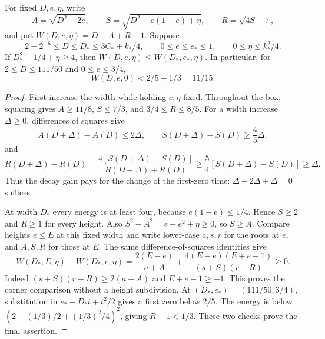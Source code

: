 \begin{lemma}\label{lem:joint-stopping-corner}
For fixed $D,e,\eta$, write
\[
 A=\sqrt{D^2-2e},\qquad
 S=\sqrt{D^2-e(1-e)+\eta},\qquad R=\sqrt{4S-7},
\]
and put $W(D,e,\eta)=D-A+R-1$.
Suppose
\[
 2-2^{-6}\le D\le D_*\le3C_*+ k_*/4,\qquad
 0\le e\le e_*\le1,\qquad0\le\eta\le k_*^2/4.
\]
If $D_*^2-1/4+\eta\ge4$, then
$W(D,e,\eta)\le W(D_*,e_*,\eta)$.
In particular, for $2\le D\le111/50$ and $0\le e\le3/4$,
\[
 W(D,e,0)<2/5+1/3=11/15.
\]
\end{lemma}
\begin{proof}
First increase the width while holding $e,\eta$ fixed. Throughout the box,
squaring gives $A\ge11/8$, $S\le7/3$, and $3/4\le R\le8/5$.
For a width increase $\Delta\ge0$, differences of squares give
\[
 A(D+\Delta)-A(D)\le2\Delta,\qquad
 S(D+\Delta)-S(D)\ge\frac45\Delta,
\]
and
\[
 R(D+\Delta)-R(D)
 =\frac{4[S(D+\Delta)-S(D)]}{R(D+\Delta)+R(D)}
 \ge\frac54[S(D+\Delta)-S(D)]\ge\Delta.
\]
Thus the decay gain pays for the change of the first-zero time:
$\Delta-2\Delta+\Delta=0$ suffices.

At width $D_*$ every energy is at least four, because
$e(1-e)\le1/4$. Hence $S\ge2$ and $R\ge1$ for every height.
Also $S^2-A^2=e+e^2+\eta\ge0$, so $S\ge A$.
Compare heights $e\le E$ at this fixed width and write lower-case
$a,s,r$ for the roots at $e$, and $A,S,R$ for those at $E$.
The same difference-of-squares identities give
\[
 W(D_*,E,\eta)-W(D_*,e,\eta)
 =\frac{2(E-e)}{a+A}
   +\frac{4(E-e)(E+e-1)}{(s+S)(r+R)}\ge0.
\]
Indeed $(s+S)(r+R)\ge2(a+A)$ and $E+e-1\ge-1$.
This proves the corner comparison without a height subdivision.
At $(D_*,e_*)=(111/50,3/4)$, substitution in
$e_*-D_*t+t^2/2$ gives a first zero below $2/5$.
The energy is below $(2+(1/3)/2+(1/3)^2/4)^2$, giving
$R-1<1/3$. These two checks prove the final assertion.
\end{proof}

